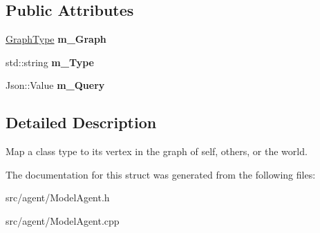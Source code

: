 \subsection*{Public Attributes}
\begin{DoxyCompactItemize}
\item 
\mbox{\label{struct_model_agent_1_1_relationship_ad32f0000ba6bf15194d3474b07de79ae}} 
\hyperlink{class_model_agent_a0e4db842aaa669acc5da6c17fae0a2de}{Graph\+Type} {\bfseries m\+\_\+\+Graph}
\item 
\mbox{\label{struct_model_agent_1_1_relationship_a8981b7f01afd9bad56717c2dfcf570f5}} 
std\+::string {\bfseries m\+\_\+\+Type}
\item 
\mbox{\label{struct_model_agent_1_1_relationship_ad1794cce99c9e6d0ed06ea0e325d3b50}} 
Json\+::\+Value {\bfseries m\+\_\+\+Query}
\end{DoxyCompactItemize}


\subsection{Detailed Description}
Map a class type to its vertex in the graph of self, others, or the world. 

The documentation for this struct was generated from the following files\+:\begin{DoxyCompactItemize}
\item 
src/agent/Model\+Agent.\+h\item 
src/agent/Model\+Agent.\+cpp\end{DoxyCompactItemize}
